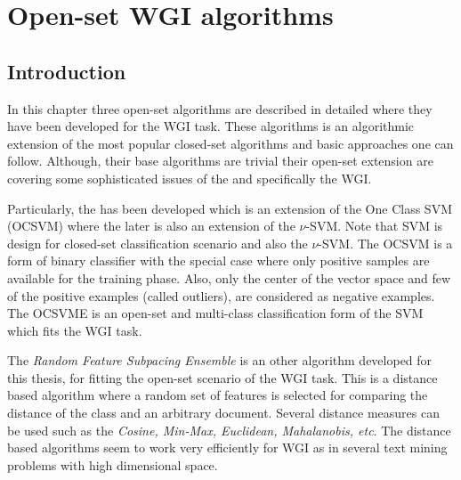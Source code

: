 
\chapter{Open-set WGI algorithms}

\label{chap:openset}


\newcommand{\keyword}[1]{\textbf{#1}}
\newcommand{\tabhead}[1]{\textbf{#1}}
\newcommand{\code}[1]{\texttt{#1}}
\newcommand{\file}[1]{\texttt{\bfseries#1}}
\newcommand{\option}[1]{\texttt{\itshape#1}}


\section{Introduction}\label{chap:openset:sec:intro}


In this chapter three open-set algorithms are described in detailed where they have been developed for the WGI task. These algorithms is an algorithmic extension of the most popular closed-set algorithms and basic approaches one can follow. Although, their base algorithms are trivial their open-set extension are covering some sophisticated issues of the  and specifically the WGI. 

Particularly, the  has been developed which is an extension of the One Class SVM (OCSVM) where the later is also an extension of the $\nu$-SVM. Note that SVM is design for closed-set classification scenario and also the $\nu$-SVM. The OCSVM is a form of binary classifier with the special case where only positive samples are available for the training phase. Also, only the center of the vector space and few of the positive examples (called outliers), are considered as negative examples. The OCSVME is an open-set and multi-class classification form of the SVM which fits the WGI task. 

The \textit{Random Feature Subpacing Ensemble} is an other algorithm developed for this thesis, for fitting the open-set scenario of the WGI task. This is a distance based algorithm where a random set of features is selected for comparing the distance of the class and an arbitrary document. Several distance measures can be used such as the \textit{Cosine, Min-Max, Euclidean, Mahalanobis, etc}. The distance based algorithms seem to work very efficiently for WGI as in several text mining problems with high dimensional space.

